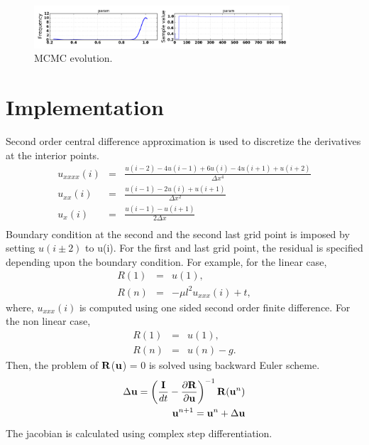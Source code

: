 \documentclass[%
notitlepage,
]{revtex4-1}
\newcommand{\mat}[1]{{\ensuremath{\bf{ #1}}}}
\begin{document}
\begin{figure}[!h]
	\includegraphics[width=0.85\textwidth]{figures/nonlinear_mcmc_05/mcmc.pdf}
    \caption{MCMC evolution.}
    \label{fig:nonconvex:mcmc:mcmc}
\end{figure}

\clearpage
\appendix
\section{Implementation}
Second order central difference approximation is used to discretize the derivatives at the interior points. 
\begin{eqnarray}
  u_{xxxx}(i) &=& \frac{u(i-2) - 4u(i-1) + 6u(i) - 4u(i+1) + u(i+2)}{\Delta x^4}\\
  u_{xx}(i) &=& \frac{u(i-1) - 2u(i) + u(i+1)}{\Delta x^2}\\
  u_{x}(i) &=& \frac{u(i-1) - u(i+1)}{2\Delta x}\\
\end{eqnarray}
Boundary condition at the second and the second last grid point is imposed by setting $u(i \pm 2)$ to u(i). For the first and last grid point, the residual is specified depending upon the boundary condition. For example, for the linear case,
\begin{eqnarray}
  R(1) &=& u(1),\\
  R(n) &=& - \mu l^2 u_{xxx}(i) + t, 
\end{eqnarray}
where, $u_{xxx}(i)$ is computed using one sided second order finite difference. For the non linear case, 
\begin{eqnarray}
  R(1) &=& u(1),\\
  R(n) &=& u(n) - g. 
\end{eqnarray}
Then, the problem of \mat{R}(\mat{u}) = 0 is solved using backward Euler scheme.
\begin{eqnarray}
  \Delta \mat{u} = \left(\frac{\mathbb{\mat{I}}}{dt} - \frac{ \partial \mat{R}}{ \partial \mat{u}}\right)^{-1} \mat{R}(\mat{u}^{n})\\
  \mat{u}^{n+1} = \mat{u}^{n} +  \Delta \mat{u}\\
\end{eqnarray}
The jacobian is calculated using complex step differentiation. 
\end{document}
